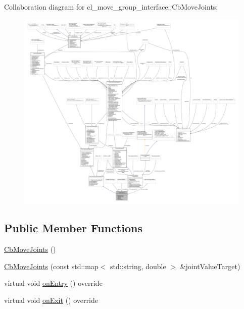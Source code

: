 Collaboration diagram for cl\+\_\+move\+\_\+group\+\_\+interface\+:\+:Cb\+Move\+Joints\+:
\nopagebreak
\begin{figure}[H]
\begin{center}
\leavevmode
\includegraphics[width=350pt]{classcl__move__group__interface_1_1CbMoveJoints__coll__graph}
\end{center}
\end{figure}
\subsection*{Public Member Functions}
\begin{DoxyCompactItemize}
\item 
\hyperlink{classcl__move__group__interface_1_1CbMoveJoints_a085919fd766e50098cbe9782de3303c6}{Cb\+Move\+Joints} ()
\item 
\hyperlink{classcl__move__group__interface_1_1CbMoveJoints_a3b79fb14e34ffdb5cd6ffafdaa6b8965}{Cb\+Move\+Joints} (const std\+::map$<$ std\+::string, double $>$ \&joint\+Value\+Target)
\item 
virtual void \hyperlink{classcl__move__group__interface_1_1CbMoveJoints_a23e4181af695aed9fa6bb4ae3f17fd76}{on\+Entry} () override
\item 
virtual void \hyperlink{classcl__move__group__interface_1_1CbMoveJoints_aff7d27d2427a5a771cb9abce1609aa27}{on\+Exit} () override
\end{DoxyCompactItemize}
